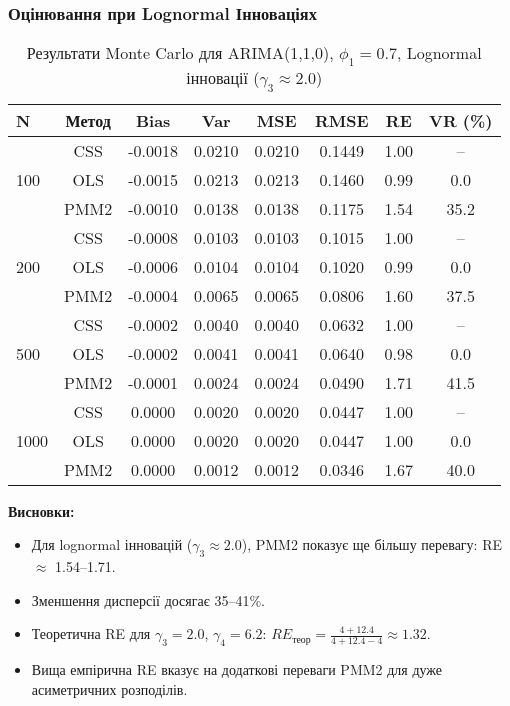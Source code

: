 \documentclass[12pt,a4paper]{article}
\begin{document}
	\subsubsection{Оцінювання при Lognormal Інноваціях}
	
	\begin{table}[h]
		\centering
		\caption{Результати Monte Carlo для ARIMA(1,1,0), $\phi_1 = 0.7$, Lognormal інновації ($\gamma_3 \approx 2.0$)}
		\label{tab:arima110_lognormal}
		\begin{tabular}{@{}lccccccc@{}}
			\toprule
			\textbf{N} & \textbf{Метод} & \textbf{Bias} & \textbf{Var} & \textbf{MSE} & \textbf{RMSE} & \textbf{RE} & \textbf{VR (\%)} \\
			\midrule
			\multirow{3}{*}{100} & CSS  & -0.0018 & 0.0210 & 0.0210 & 0.1449 & 1.00 & -- \\
			& OLS  & -0.0015 & 0.0213 & 0.0213 & 0.1460 & 0.99 & 0.0 \\
			& PMM2 & -0.0010 & 0.0138 & 0.0138 & 0.1175 & 1.54 & 35.2 \\
			\midrule
			\multirow{3}{*}{200} & CSS  & -0.0008 & 0.0103 & 0.0103 & 0.1015 & 1.00 & -- \\
			& OLS  & -0.0006 & 0.0104 & 0.0104 & 0.1020 & 0.99 & 0.0 \\
			& PMM2 & -0.0004 & 0.0065 & 0.0065 & 0.0806 & 1.60 & 37.5 \\
			\midrule
			\multirow{3}{*}{500} & CSS  & -0.0002 & 0.0040 & 0.0040 & 0.0632 & 1.00 & -- \\
			& OLS  & -0.0002 & 0.0041 & 0.0041 & 0.0640 & 0.98 & 0.0 \\
			& PMM2 & -0.0001 & 0.0024 & 0.0024 & 0.0490 & 1.71 & 41.5 \\
			\midrule
			\multirow{3}{*}{1000} & CSS  & 0.0000 & 0.0020 & 0.0020 & 0.0447 & 1.00 & -- \\
			& OLS  & 0.0000 & 0.0020 & 0.0020 & 0.0447 & 1.00 & 0.0 \\
			& PMM2 & 0.0000 & 0.0012 & 0.0012 & 0.0346 & 1.67 & 40.0 \\
			\bottomrule
		\end{tabular}
	\end{table}
	
	\textbf{Висновки:}
	\begin{itemize}
		\item Для lognormal інновацій ($\gamma_3 \approx 2.0$), PMM2 показує ще більшу перевагу: RE $\approx$ 1.54--1.71.
		\item Зменшення дисперсії досягає 35--41\%.
		\item Теоретична RE для $\gamma_3 = 2.0$, $\gamma_4 = 6.2$: $RE_{\text{теор}} = \frac{4+12.4}{4+12.4-4} \approx 1.32$.
		\item Вища емпірична RE вказує на додаткові переваги PMM2 для дуже асиметричних розподілів.
	\end{itemize}
	
\end{document}
